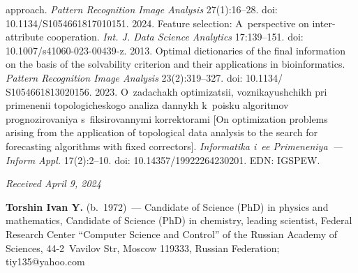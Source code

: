 \begin{multicols}{2}
{{\begin{thebibliography}{9}
approach. \textit{Pattern Recognition Image Analysis} 27(1):16--28. doi: 
10.1134/S1054661817010151.
 2024. Feature selection: A~perspective on inter-attribute cooperation. \textit{Int. J. 
Data Science Analytics} 17:139--151. doi: 10.1007/s41060-023-00439-z.
 2013. Optimal dictionaries of the final information on the basis of the 
solvability criterion and their applications in bioinformatics. \textit{Pattern Recognition Image 
Analysis}  23(2):319--327. doi: 10.1134/ S1054661813020156.
 2023. O~zadachakh optimizatsii, voznikayushchikh pri primenenii 
topologicheskogo analiza dannykh k~poisku algoritmov prognozirovaniya s~fiksirovannymi 
korrektorami [On optimization problems arising from the application of topological data analysis 
to the search for forecasting algorithms with fixed correctors]. \textit{Informatika i~ee 
Primeneniya~--- Inform Appl.} 17(2):2--10. doi: 10.14357/19922264230201. EDN: IGSPEW.

\end{thebibliography}

 }
 }

\end{multicols}

\vspace*{-6pt}

\hfill{\small\textit{Received April 9, 2024}} 

\vspace*{-12pt}


\Contrl

\vspace*{-3pt}

\noindent
\textbf{Torshin Ivan Y.} (b.\ 1972)~--- Candidate of Science (PhD) in physics and mathematics, 
Candidate of Science (PhD) in chemistry, leading scientist, Federal Research Center ``Computer 
Science and Control'' of the Russian Academy of Sciences, 44-2~Vavilov Str, Moscow 119333, 
Russian Federation; \mbox{tiy135@yahoo.com}
  
  



\label{end\stat}

\renewcommand{\bibname}{\protect\rm Литература} 